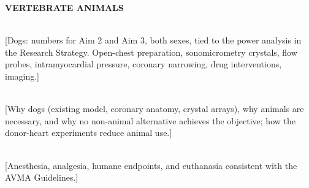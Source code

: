 \documentclass[11pt]{article}
\begin{document}
\textbf{VERTEBRATE ANIMALS}

\\
{}[Dogs: numbers for Aim 2 and Aim 3, both sexes, tied to the power analysis in the Research Strategy. Open-chest preparation, sonomicrometry crystals, flow probes, intramyocardial pressure, coronary narrowing, drug interventions, imaging.]

\\
{}[Why dogs (existing model, coronary anatomy, crystal arrays), why animals are necessary, and why no non-animal alternative achieves the objective; how the donor-heart experiments reduce animal use.]

\\
{}[Anesthesia, analgesia, humane endpoints, and euthanasia consistent with the AVMA Guidelines.]
\end{document}
